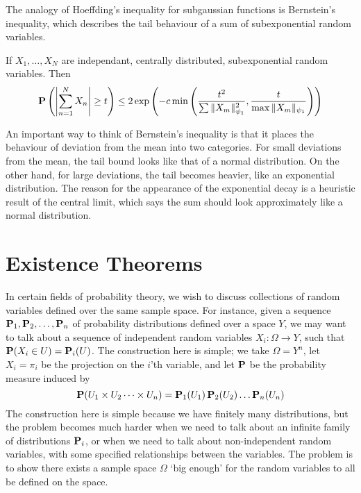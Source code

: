 The analogy of Hoeffding's inequality for subgaussian functions is Bernstein's inequality, which describes the tail behaviour of a sum of subexponential random variables.

\begin{theorem}
    If $X_1, \dots, X_N$ are independant, centrally distributed, subexponential random variables. Then
    \[ \operatorname{\mathbf{P}} \left( \left| \sum_{n = 1}^N X_n \right| \geq t \right) \leq 2 \exp \left( -c \min \left( \frac{t^2}{\sum \| X_m \|_{\psi_1}^2}, \frac{t}{\max \| X_m \|_{\psi_1}} \right) \right) \]
\end{theorem}

An important way to think of Bernstein's inequality is that it places the behaviour of deviation from the mean into two categories. For small deviations from the mean, the tail bound looks like that of a normal distribution. On the other hand, for large deviations, the tail becomes heavier, like an exponential distribution. The reason for the appearance of the exponential decay is a heuristic result of the central limit, which says the sum should look approximately like a normal distribution.














\chapter{Existence Theorems}

In certain fields of probability theory, we wish to discuss collections of random variables defined over the same sample space. For instance, given a sequence $\operatorname{\mathbf{P}}_1, \operatorname{\mathbf{P}}_2, \dots, \operatorname{\mathbf{P}}_n$ of probability distributions defined over a space $Y$, we may want to talk about a sequence of independent random variables $X_i: \Omega \to Y$, such that $\operatorname{\mathbf{P}}(X_i \in U) = \operatorname{\mathbf{P}}_i(U)$. The construction here is simple; we take $\Omega = Y^n$, let $X_i = \pi_i$ be the projection on the $i$'th variable, and let $\operatorname{\mathbf{P}}$ be the probability measure induced by
%
\[ \operatorname{\mathbf{P}}(U_1 \times U_2 \dots \times U_n) = \operatorname{\mathbf{P}}_1(U_1) \operatorname{\mathbf{P}}_2(U_2) \dots \operatorname{\mathbf{P}}_n(U_n) \]
%
The construction here is simple because we have finitely many distributions, but the problem becomes much harder when we need to talk about an infinite family of distributions $\operatorname{\mathbf{P}}_i$, or when we need to talk about non-independent random variables, with some specified relationships between the variables. The problem is to show there exists a sample space $\Omega$ `big enough' for the random variables to all be defined on the space.

